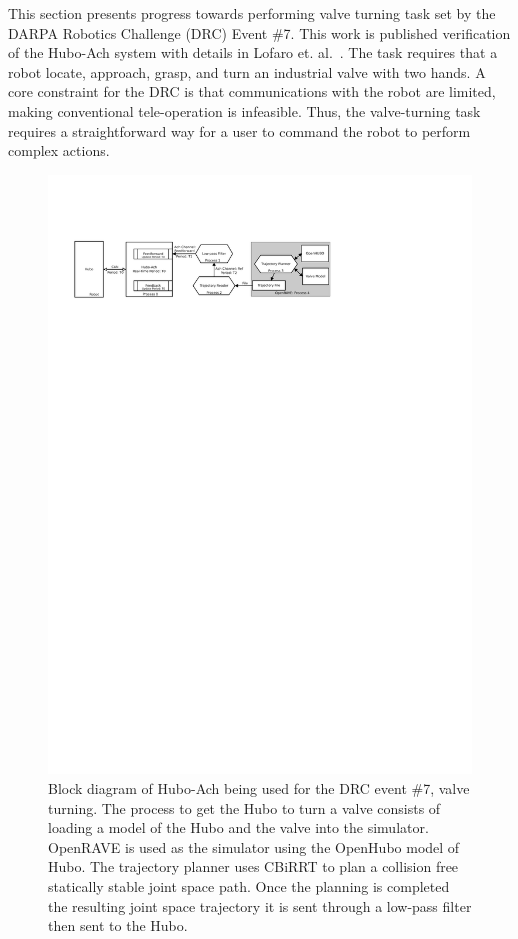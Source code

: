 This section presents progress towards performing valve turning task set by the DARPA Robotics Challenge (DRC) Event \#7\cite{drc}. 
This work is published verification of the Hubo-Ach system with details in Lofaro et. al.~\cite{lofaroTePRA2013Valve}.
The task requires that a robot locate, approach, grasp, and turn an industrial valve with two hands.
A core constraint for the DRC is that communications with the robot are limited, making conventional tele-operation is infeasible.
Thus, the valve-turning task requires a straightforward way for a user to command the robot to perform complex actions. 

\begin{figure}[thpb]
  \centering

      \includegraphics[width=1.0\columnwidth]{./examples/pix/hubo-ach-diagram-openhubo-valve.pdf}

\caption{Block diagram of Hubo-Ach being used for the DRC event \#7, valve turning.  
The process to get the Hubo to turn a valve consists of loading a model of the Hubo and the valve into the simulator.  
OpenRAVE is used as the simulator using the OpenHubo model of Hubo.  
The trajectory planner uses CBiRRT to plan a collision free statically stable joint space path.  
Once the planning is completed the resulting joint space trajectory it is sent through a low-pass filter then sent to the Hubo.}
  \label{fig:block-valve}
\end{figure}



